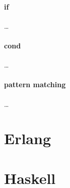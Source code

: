 \documentclass[a4paper,landscape,10pt]{article}
\begin{document}
\begin{multicols*}{2}
  \paragraph{if}

  \dots

  \paragraph{cond}

  \dots

  \paragraph{pattern matching}

  \dots

\end{multicols*}

\clearpage

\section{Erlang}

\clearpage

\section{Haskell}
\end{document}
